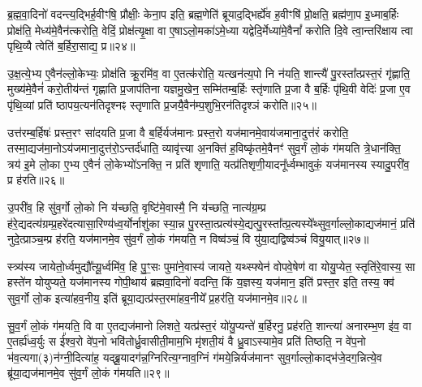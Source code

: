 {\anuvakamend[{भ॒ज॒ति॒ प्र॒जाप॑तिनेव॒ वै त्रय॑स्त्रिꣳशच्च॥४॥}]}

ब्र॒ह्म॒वा॒दिनो॑ वदन्त्य॒द्भिर्\mbox{}ह॒वीꣳषि॒ प्रौक्षीः॒ केना॒प इति॒ ब्रह्म॒णेति॑ ब्रूयाद॒द्भिर्\mbox{}ह्ये॑व ह॒वीꣳषि॑ प्रो॒क्षति॒ ब्रह्म॑णा॒प इ॒ध्माब॒र्\mbox{}हिः प्रोक्ष॑ति॒ मेध्य॑मे॒वैन॑त्करोति॒ वेदिं॒ प्रोक्ष॑त्यृ॒क्षा वा ए॒षा\-ऽलो॒मका॑\-ऽमे॒ध्या यद्वेदि॒र्मेध्या॑मे॒वैनां᳚ करोति दि॒वे त्वा॒न्तरि॑क्षाय त्वा पृथि॒व्यै त्वेति॑ ब॒र्\mbox{}हिरा॒साद्य॒ प्र॥२४॥

उ॒क्ष॒त्ये॒भ्य ए॒वैन॑ल्लो॒केभ्यः॒ प्रोक्ष॑ति क्रू॒रमि॑व॒ वा ए॒तत्क॑रोति॒ यत्खन॑त्य॒पो नि न॑यति॒ शान्त्यै॑ पु॒रस्ता᳚त्प्रस्त॒रं गृ॑ह्णाति॒ मुख्य॑मे॒वैनं॑ करो॒तीय॑न्तं गृह्णाति प्र॒जाप॑तिना यज्ञमु॒खेन॒ सम्मि॑तम्ब॒र्\mbox{}हिः स्तृ॑णाति प्र॒जा वै ब॒र्\mbox{}हिः पृ॑थि॒वी वेदिः॑ प्र॒जा ए॒व पृ॑थि॒व्यां प्रति॑ ष्ठापय॒त्यन॑तिदृश्नꣴ स्तृणाति प्र॒जयै॒वैन॑म्प॒शुभि॒रन॑तिदृश्ञं करोति॥२५॥

उत्त॑रम्ब॒र्\mbox{}हिषः॑ प्रस्त॒रꣳ सा॑दयति प्र॒जा वै ब॒र्\mbox{}हिर्यज॑मानः प्रस्त॒रो यज॑मानमे॒वाय॑जमाना॒दुत्त॑रं करोति॒ तस्मा॒द्यज॑मा॒नो\-ऽय॑जमाना॒दुत्त॑रो॒\-ऽन्तर्द॑धाति॒ व्यावृ॑त्त्या अ॒नक्ति॑ ह॒विष्कृ॑तमे॒वैनꣳ॑ सुव॒र्गं लो॒कं ग॑मयति त्रे॒धान॑क्ति॒ त्रय॑ इ॒मे लो॒का ए॒भ्य ए॒वैनं॑ लो॒केभ्यो॑\-ऽनक्ति॒ न प्रति॑ शृणाति॒ यत्प्र॑तिशृणी॒यादनू᳚र्ध्वम्भावुकं॒ यज॑मानस्य स्यादु॒परी॑व॒ प्र ह॑रति॥२६॥

उ॒परी॑व॒ हि सु॑व॒र्गो लो॒को नि य॑च्छति॒ वृष्टि॑मे॒वास्मै॒ नि य॑च्छति॒ नात्य॑ग्र॒म्प्र ह॑रे॒द्यदत्य॑ग्रम्प्र॒हरे॑दत्यासा॒रिण्य॑ध्व॒र्यो\-र्नाशु॑का स्या॒न्न पु॒रस्ता॒त्प्रत्य॑स्ये॒द्यत्पु॒रस्ता᳚त्प्र॒त्यस्ये᳚थ्सुव॒र्गाल्लो॒काद्यज॑मानं॒ प्रति॑ नुदे॒त्प्राञ्च॒म्प्र ह॑रति॒ यज॑मानमे॒व सु॑व॒र्गं लो॒कं ग॑मयति॒ न विष्व॑ञ्चं॒ वि यु॑या॒द्यद्विष्व॑ञ्चं वियु॒यात्॥२७॥

स्त्र्य॑स्य जायेतो॒र्ध्वमुद्यौ᳚त्यू॒र्ध्वमि॑व॒ हि पु॒ꣳ॒सः पुमा॑ने॒वास्य॑ जायते॒ यथ्स्फ्येन॑ वोपवे॒षेण॑ वा योयु॒प्येत॒ स्तृति॑रे॒वास्य॒ सा हस्ते॑न योयुप्यते॒ यज॑मानस्य गोपी॒थाय॑ ब्रह्मवा॒दिनो॑ वदन्ति॒ किं य॒ज्ञस्य॒ यज॑मान॒ इति॑ प्रस्त॒र इति॒ तस्य॒ क्व॑ सुव॒र्गो लो॒क इत्या॑हव॒नीय॒ इति॑ ब्रूया॒द्यत्प्र॑स्त॒रमा॑हव॒नीये᳚ प्र॒हर॑ति॒ यज॑मानमे॒व॥२८॥

सु॒व॒र्गं लो॒कं ग॑मयति॒ वि वा ए॒तद्यज॑मानो लिशते॒ यत्प्र॑स्त॒रं यो॑यु॒प्यन्ते॑ ब॒र्\mbox{}हिरनु॒ प्रह॑रति॒ शान्त्या॑ अनारम्भ॒ण इ॑व॒ वा ए॒तर्\mbox{}ह्य॑ध्व॒र्युः स ई᳚श्व॒रो वे॑प॒नो भवि॑तोर्ध्रु॒वासीती॒माम॒भि मृ॑शती॒यं वै ध्रु॒वा\-ऽस्यामे॒व प्रति॑ तिष्ठति॒ न वे॑प॒नो भ॑व॒त्यगा(३)न॑ग्नी॒दित्या॑ह॒ यद्ब्रू॒यादग॑न्न॒ग्निरित्य॒ग्नाव॒ग्निं ग॑मये॒न्निर्यज॑मानꣳ सुव॒र्गाल्लो॒काद्भ॑जे॒दग॒न्नित्ये॒व ब्रू॑या॒द्यज॑मानमे॒व सु॑व॒र्गं लो॒कं ग॑मयति॥२९॥

